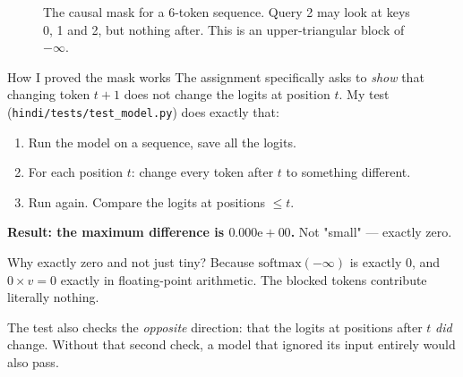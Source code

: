 \documentclass[11pt]{report}
\newcommand{\p}[1]{\texttt{#1}}
\begin{document}
\begin{figure}[htbp]
\centering
{}
\caption{The causal mask for a 6-token sequence. Query 2 may look at keys 0, 1
and 2, but nothing after. This is an upper-triangular block of $-\infty$.}
\label{fig:mask}
\end{figure}

\begin{implementation}{How I proved the mask works}
The assignment specifically asks to \emph{show} that changing token $t{+}1$ does
not change the logits at position $t$. My test
(\p{hindi/tests/test\_model.py}) does exactly that:

\begin{enumerate}[leftmargin=*]
\item Run the model on a sequence, save all the logits.
\item For each position $t$: change every token after $t$ to something different.
\item Run again. Compare the logits at positions $\le t$.
\end{enumerate}

\textbf{Result: the maximum difference is $0.000\text{e}{+}00$.} Not "small" ---
exactly zero.

Why exactly zero and not just tiny? Because $\text{softmax}(-\infty)$ is exactly
$0$, and $0 \times v = 0$ exactly in floating-point arithmetic. The blocked
tokens contribute literally nothing.

The test also checks the \emph{opposite} direction: that the logits at positions
after $t$ \emph{did} change. Without that second check, a model that ignored its
input entirely would also pass.
\end{implementation}
\end{document}
